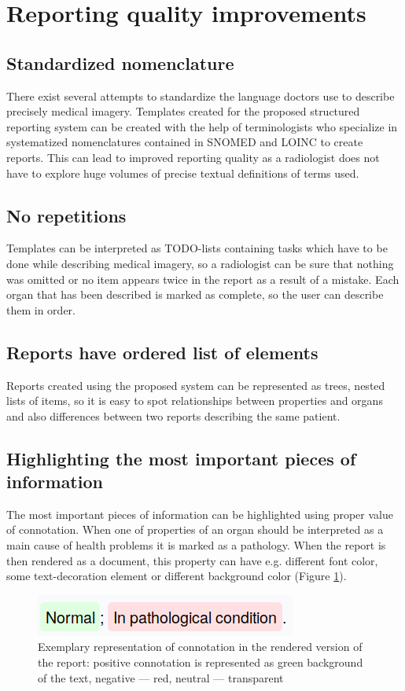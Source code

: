 \documentclass[12pt, twoside, openany]{report}
\theoremstyle{definition}
\begin{document}
\section{Reporting quality improvements}
\subsection{Standardized nomenclature}
There exist several attempts to standardize the language doctors use to describe precisely medical imagery. Templates created for the proposed structured reporting system can be created with the help of terminologists who specialize in systematized nomenclatures contained in SNOMED and LOINC to create reports. This can lead to improved reporting quality as a radiologist does not have to explore huge volumes of precise textual definitions of terms used. 
\subsection{No repetitions}
Templates can be interpreted as TODO-lists containing tasks which have to be done while describing medical imagery, so a radiologist can be sure that nothing was omitted or no item appears twice in the report as a result of a mistake. Each organ that has been described is marked as complete, so the user can describe them in order.
\subsection{Reports have ordered list of elements}
Reports created using the proposed system can be represented as trees, nested lists of items, so it is easy to spot relationships between properties and organs and also differences between two reports describing the same patient.
\subsection{Highlighting the most important pieces of information}
The most important pieces of information can be highlighted using proper value of connotation. When one of properties of an organ should be interpreted as a main cause of health problems it is marked as a pathology. When the report is then rendered as a document, this property can have e.g. different font color, some text-decoration element or different background color (Figure \ref{property-connotation-rendered}).

\begin{figure}
	\centering
	\includegraphics[width=0.3\linewidth]{property-connotation-rendered}
	\caption{Exemplary representation of connotation in the rendered version of the report: positive connotation is represented as green background of the text, negative --- red, neutral --- transparent
		\label{property-connotation-rendered}
	}
\end{figure}
\end{document}
